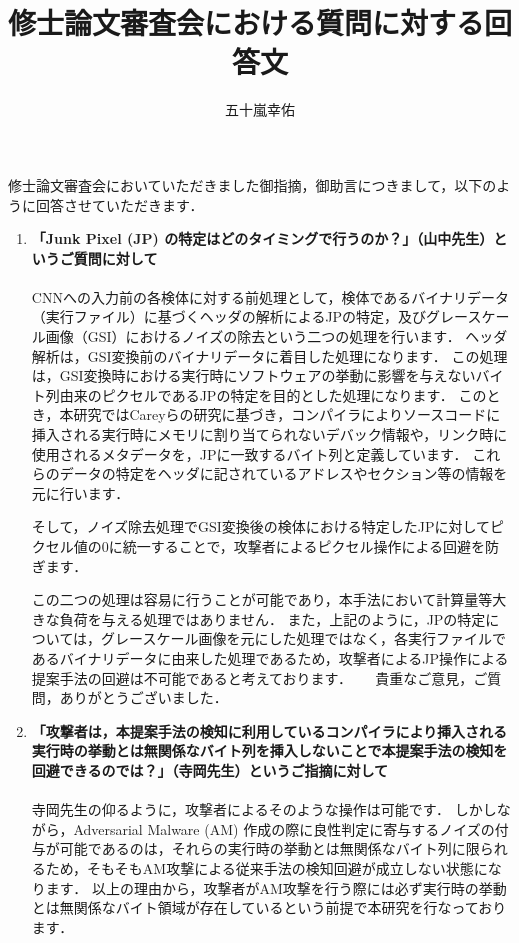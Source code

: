 \documentclass[11pt, a4paper]{article}
\title{修士論文審査会における質問に対する回答文}
\author{五十嵐幸佑}
\begin{document}
\maketitle
修士論文審査会においていただきました御指摘，御助言につきまして，以下のように回答させていただきます．

\begin{enumerate} 
	\item \textbf{「Junk Pixel (JP) の特定はどのタイミングで行うのか？」（山中先生）というご質問に対して}\\ \\
	CNNへの入力前の各検体に対する前処理として，検体であるバイナリデータ（実行ファイル）に基づくヘッダの解析によるJPの特定，及びグレースケール画像（GSI）におけるノイズの除去という二つの処理を行います．
	ヘッダ解析は，GSI変換前のバイナリデータに着目した処理になります．
	この処理は，GSI変換時における実行時にソフトウェアの挙動に影響を与えないバイト列由来のピクセルであるJPの特定を目的とした処理になります．
		このとき，本研究ではCareyら\cite{ae}の研究に基づき，コンパイラによりソースコードに挿入される実行時にメモリに割り当てられないデバック情報や，リンク時に使用されるメタデータを，JPに一致するバイト列と定義しています．
	これらのデータの特定をヘッダに記されているアドレスやセクション等の情報を元に行います．
	
	そして，ノイズ除去処理でGSI変換後の検体における特定したJPに対してピクセル値の0に統一することで，攻撃者によるピクセル操作による回避を防ぎます．
	
	この二つの処理は容易に行うことが可能であり，本手法において計算量等大きな負荷を与える処理ではありません．
	また，上記のように，JPの特定については，グレースケール画像を元にした処理ではなく，各実行ファイルであるバイナリデータに由来した処理であるため，攻撃者によるJP操作による提案手法の回避は不可能であると考えております．
    　  
	貴重なご意見，ご質問，ありがとうございました．
  \vspace{10mm}

  \item \textbf{「攻撃者は，本提案手法の検知に利用しているコンパイラにより挿入される実行時の挙動とは無関係なバイト列を挿入しないことで本提案手法の検知を回避できるのでは？」（寺岡先生）というご指摘に対して}\\ \\
	寺岡先生の仰るように，攻撃者によるそのような操作は可能です．
	しかしながら，Adversarial Malware (AM) 作成の際に良性判定に寄与するノイズの付与が可能であるのは，それらの実行時の挙動とは無関係なバイト列に限られるため，そもそもAM攻撃による従来手法の検知回避が成立しない状態になります．
	以上の理由から，攻撃者がAM攻撃を行う際には必ず実行時の挙動とは無関係なバイト領域が存在しているという前提で本研究を行なっております．
    

\end{enumerate}
\end{document}
